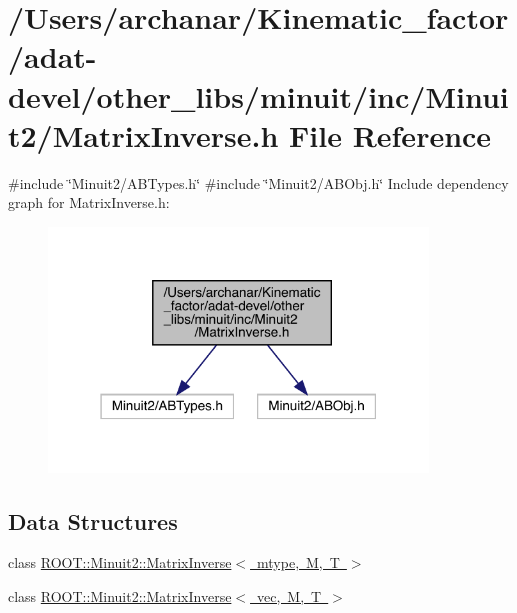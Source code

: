 \hypertarget{adat-devel_2other__libs_2minuit_2inc_2Minuit2_2MatrixInverse_8h}{}\section{/\+Users/archanar/\+Kinematic\+\_\+factor/adat-\/devel/other\+\_\+libs/minuit/inc/\+Minuit2/\+Matrix\+Inverse.h File Reference}
\label{adat-devel_2other__libs_2minuit_2inc_2Minuit2_2MatrixInverse_8h}
{\ttfamily \#include \char`\"{}Minuit2/\+A\+B\+Types.\+h\char`\"{}}\newline
{\ttfamily \#include \char`\"{}Minuit2/\+A\+B\+Obj.\+h\char`\"{}}\newline
Include dependency graph for Matrix\+Inverse.\+h\+:
\nopagebreak
\begin{figure}[H]
\begin{center}
\leavevmode
\includegraphics[width=286pt]{d2/d24/adat-devel_2other__libs_2minuit_2inc_2Minuit2_2MatrixInverse_8h__incl}
\end{center}
\end{figure}
\subsection*{Data Structures}
\begin{DoxyCompactItemize}
\item 
class \mbox{\hyperlink{classROOT_1_1Minuit2_1_1MatrixInverse}{R\+O\+O\+T\+::\+Minuit2\+::\+Matrix\+Inverse$<$ mtype, M, T $>$}}
\item 
class \mbox{\hyperlink{classROOT_1_1Minuit2_1_1MatrixInverse_3_01vec_00_01M_00_01T_01_4}{R\+O\+O\+T\+::\+Minuit2\+::\+Matrix\+Inverse$<$ vec, M, T $>$}}
\end{DoxyCompactItemize}
